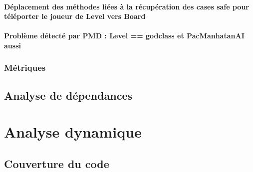 \documentclass[12pt, openany]{report}
\begin{document}
\paragraph{Déplacement des méthodes liées à la récupération des cases \og safe \fg pour téléporter le joueur de Level vers Board}
\paragraph{Problème détecté par PMD : Level == godclass et PacManhatanAI aussi}

\subsubsection{Métriques}


\subsection{Analyse de dépendances}


\section{Analyse dynamique}
\subsection{Couverture du code}
\end{document}
